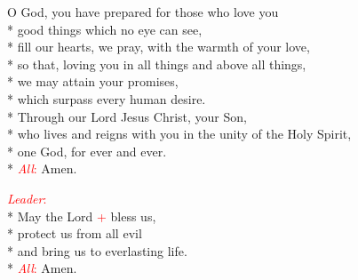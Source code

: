 \documentclass[letterpaper,14pt]{extarticle}
\newcommand{\sidestar}[1]{\textcolor{red}{\textit{#1}:}}
\newcommand{\rednote}[1]{\textcolor{red}{#1}}
\begin{document}
O God, you have prepared for those who love you \\*
good things which no eye can see, \\*
fill our hearts, we pray, with the warmth of your love, \\*
so that, loving you in all things and above all things, \\*
we may attain your promises, \\*
which surpass every human desire. \\*
Through our Lord Jesus Christ, your Son, \\*
who lives and reigns with you in the unity of the Holy Spirit, \\*
one God, for ever and ever. \\*
\sidestar{All} Amen.


\sidestar{Leader}\\*
May the Lord \rednote{+} bless us, \\*
protect us from all evil \\*
and bring us to everlasting life. \\*
\sidestar{All} Amen.
\end{document}
